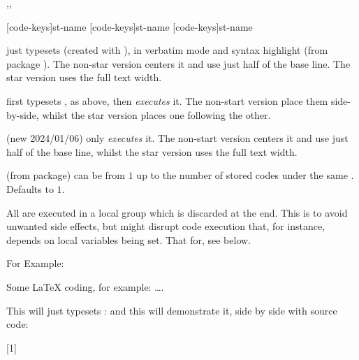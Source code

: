 \documentclass{article}
\begin{document}
\begin{codedescribe}[code,update=2024/01/06,update=2025/04/29]{\tscode*,\tsdemo*,\tsresult*}
	\begin{codesyntax}%
		\tsmacro{\tscode*}[code-keys]{st-name}
		\tsmacro{\tsdemo*}[code-keys]{st-name}
		\tsmacro{\tsresult*}[code-keys]{st-name}
	\end{codesyntax}
\tsmacro{\tscode*}{} just typesets  (created with ), in verbatim mode and syntax highlight (from  package \cite{listings}). The non-star version centers it and use just half of the base line. The star version uses the full text width.

\tsmacro{\tsdemo*}{} first typesets , as above, then \emph{executes} it. The non-start version place them side-by-side, whilst the star version places one following the other.

(new 2024/01/06) \tsmacro{\tsresult*}{} only \emph{executes} it. The non-start version centers it and use just half of the base line, whilst the star version uses the full text width.
\end{codedescribe}

\begin{tsremark}
  (from  package)  can be from $1$ up to the number of stored codes under the same . Defaults to $1$.
\end{tsremark}

\begin{tsremark}
  All are executed in a local group which is discarded at the end. This is to avoid unwanted side effects, but might disrupt code execution that, for instance, depends on local variables being set. That for, see \tsobj{\tsexec} below.
\end{tsremark}

For Example:
\begin{codestore}[st=democodestore]
\begin{codestore}[stmeta]
		Some \LaTeX{} coding, for example: \ldots.
\end{codestore}  
This will just typesets :
and this will demonstrate it, side by side with source code:
\end{codestore}
[1]
\end{document}
